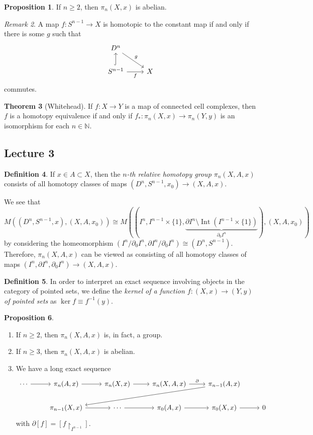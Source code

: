 \documentclass[10pt,letterpaper,cm]{nupset}
\theoremstyle{definition}
\newtheorem{defn}{Definition}[subsection]
\theoremstyle{theorem}
\newtheorem{theorem}[defn]{Theorem}
\newtheorem{prop}[defn]{Proposition}
\theoremstyle{remark}
\newtheorem{remark}[defn]{Remark}
\newcommand{\N}{\mathbb N}
\newcommand{\1}{\mathbb{1}}
\newcommand{\0}{\vec 0}
\DeclareMathOperator{\Int}{Int}
\newcommand{\be}{\begin{enumerate}}
\newcommand{\ee}{\end{enumerate}}
\begin{document}
\begin{prop}
If $n\geq 2$, then $\pi_n(X, x)$ is abelian.
\end{prop}


\begin{remark}
A map $f: S^{n-1} \to X$ is homotopic to the constant map if and only if there is some $g$ such that 
\[
\begin{tikzcd}
D^n \arrow[rd, "g"]                     &   \\
S^{n-1} \arrow[r, "f"'] \arrow[u, hook] & X
\end{tikzcd}
\] commutes.
\end{remark}

\begin{theorem}[Whitehead]\label{WH}
If $f: X \to Y$ is a map of connected cell complexes, then $f$ is a homotopy equivalence if and only if $f_{\ast} : \pi_n(X,x) \to \pi_n(Y, y)$ is an isomorphism for each $n \in \N$.
\end{theorem}

\subsection{Lecture 3}

\begin{defn}
If $x\in A \subset X$, then the \textit{$n$-th relative homotopy group $\pi_n(X, A, x)$} consists of all homotopy classes of maps $(D^n, S^{n-1}, x_0) \to (X, A, x)$. 
\end{defn}

We see that  $$M((D^n, S^{n-1}, x), (X, A, x_0)) \cong M((I^n, I^{n-1} \times \{1\}, \underbrace{\partial{I^n} \setminus \Int(I^{n-1} \times \{1\})}_{\partial_0{I^n}}), (X, A, x_0))$$ by considering the homeomorphism $(I^n/\partial_0{I^n}, \partial{I^n}/\partial_0{I^n}) \cong (D^n, S^{n-1})$. Therefore, $\pi_n(X, A, x)$ can be viewed as consisting of all homotopy classes of maps $(I^n, \partial{I^n}, \partial_0{I^n}) \to (X, A, x)$.

\begin{defn}
In order to interpret an exact sequence involving objects in the category of pointed sets, we define the \textit{kernel of a function $f: (X,x) \to (Y,y)$ of pointed sets} as $\ker{f} \equiv f^{-1}(y)$.   
\end{defn}

\begin{prop} $ $
\be
\item If $n\geq 2$, then $\pi_n(X, A, x)$ is, in fact, a group.
\item If $n\geq 3$, then $\pi_n(X, A, x)$ is abelian.
\item We have a long exact sequence 
\[
\begin{tikzcd}
\cdots \arrow[r] & {\pi_n(A,x)} \arrow[r]     & {\pi_n(X, x)} \arrow[r] & {\pi_n(X, A, x)} \arrow[r, "\partial"] & {\pi_{n-1}(A,x)} \arrow[llld] &   \\
                 & {\pi_{n-1}(X,x)} \arrow[r] & \cdots \arrow[r]        & {\pi_0(A, x)} \arrow[r]                & {\pi_0(X,x)} \arrow[r]        & 0
\end{tikzcd}
\] with $\partial{[f]} = \left[f\restriction_{I^{n-1}}\right]$.
\ee 
\end{prop}
\end{document}
